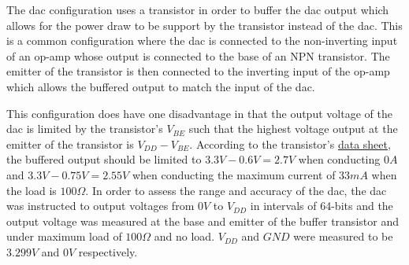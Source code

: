 The \gls{dac} configuration uses a transistor in order to buffer the \gls{dac} output which allows for the power draw to be support by the transistor instead of the \gls{dac}.
This is a common configuration where the \gls{dac} is connected to the non-inverting input of an op-amp whose output is connected to the base of an NPN transistor.
The emitter of the transistor is then connected to the inverting input of the op-amp which allows the buffered output to match the input of the \gls{dac}.

This configuration does have one disadvantage in that the output voltage of the \gls{dac} is limited by the transistor's $V_{BE}$ such that the highest voltage output at the emitter of the transistor is $V_{DD} - V_{BE}$.
According to the transistor's \href{https://www.lcsc.com/datasheet/lcsc_datasheet_2310131500_Jiangsu-Changjing-Electronics-Technology-Co---Ltd--S8050-J3Y-RANGE-200-350_C2146.pdf}{data sheet}, the buffered output should be limited to $3.3V - 0.6V = 2.7V$ when conducting $0A$ and $3.3V - 0.75V = 2.55V$ when conducting the maximum current of $33mA$ when the load is $100\Omega$.
In order to assess the range and accuracy of the \gls{dac}, the \gls{dac} was instructed to output voltages from $0V$ to $V_{DD}$ in intervals of 64-bits and the output voltage was measured at the base and emitter of the buffer transistor and under maximum load of $100\Omega$ and no load.
$V_{DD}$ and $GND$ were measured to be $3.299V$ and $0V$ respectively.

